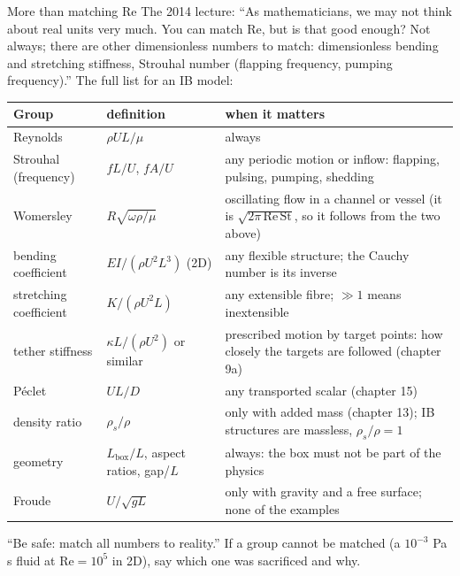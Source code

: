 \documentclass[aspectratio=169,11pt]{beamer}
\begin{document}
\begin{frame}{More than matching Re}
\label{fr:matchall}
\footnotesize The 2014 lecture: ``As mathematicians, we may not think about real units very much. You can match Re, but is that good enough? Not always; there are other dimensionless numbers to match: dimensionless bending and stretching stiffness, Strouhal number (flapping frequency, pumping frequency).'' The full list for an IB model:

\tiny
\begin{tabular}{@{}L{0.2\textwidth}L{0.26\textwidth}L{0.44\textwidth}@{}}
\toprule
Group & definition & when it matters\\
\midrule
Reynolds & $\rho UL/\mu$ & always\\
Strouhal (frequency) & $fL/U$, $fA/U$ & any periodic motion or inflow: flapping, pulsing, pumping, shedding\\
Womersley & $R\sqrt{\omega\rho/\mu}$ & oscillating flow in a channel or vessel (it is $\sqrt{2\pi\,\mathrm{Re}\,\mathrm{St}}$, so it follows from the two above)\\
bending coefficient & $EI/(\rho U^2L^3)$ (2D) & any flexible structure; the Cauchy number is its inverse\\
stretching coefficient & $K/(\rho U^2 L)$ & any extensible fibre; $\gg 1$ means inextensible\\
tether stiffness & $\kappa L/(\rho U^2)$ or similar & prescribed motion by target points: how closely the targets are followed (chapter 9a)\\
P\'eclet & $UL/D$ & any transported scalar (chapter 15)\\
density ratio & $\rho_s/\rho$ & only with added mass (chapter 13); IB structures are massless, $\rho_s/\rho = 1$\\
geometry & $L_{\mathrm{box}}/L$, aspect ratios, gap/$L$ & always: the box must not be part of the physics\\
Froude & $U/\sqrt{gL}$ & only with gravity and a free surface; none of the examples\\
\bottomrule
\end{tabular}

\footnotesize ``Be safe: match all numbers to reality.'' If a group cannot be matched (a $10^{-3}$ Pa s fluid at $\mathrm{Re} = 10^5$ in 2D), say which one was sacrificed and why.
\end{frame}
\end{document}
